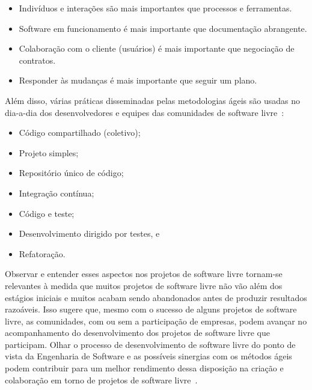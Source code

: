 \begin{itemize}

\item {Indivíduos e interações são mais importantes que processos e ferramentas.}

\item {Software em funcionamento é mais importante que documentação abrangente.}

\item {Colaboração com o cliente (usuários) é mais importante que negociação de contratos.}

\item {Responder às mudanças é mais importante que seguir um plano.}

\end{itemize}

Além disso, várias práticas disseminadas pelas metodologias ágeis são usadas no
dia-a-dia dos desenvolvedores e equipes das comunidades
de software livre~\cite{corbucci2011freemethods}:

\begin{itemize}

\item {Código compartilhado (coletivo);}
\item {Projeto simples;}
\item {Repositório único de código;}
\item {Integração contínua;}
\item {Código e teste;}
\item {Desenvolvimento dirigido por testes, e}
\item {Refatoração.}

\end{itemize}

Observar e entender esses aspectos nos projetos de software livre tornam-se
relevantes à medida que muitos projetos de software livre não vão além dos
estágios iniciais e muitos acabam sendo abandonados antes de produzir
resultados razoáveis.
%
Isso sugere que, mesmo com o sucesso de alguns projetos de software livre,
as comunidades, com ou sem a participação de empresas, podem avançar no
acompanhamento do desenvolvimento dos projetos de software livre que participam.
%
Olhar o processo de desenvolvimento de software livre do ponto de vista da 
Engenharia de Software e as possíveis sinergias com os métodos ágeis podem
contribuir para um melhor rendimento dessa disposição na criação e colaboração
em torno de projetos de software livre~\cite{meirelles2013metrics}.

